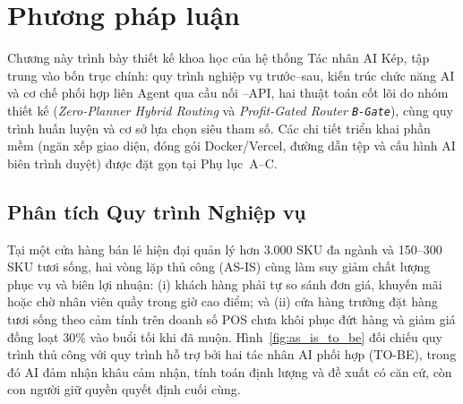 \chapter{Phương pháp luận}

Chương này trình bày thiết kế khoa học của hệ thống Tác nhân AI Kép, tập trung vào bốn trục chính: quy trình nghiệp vụ trước--sau, kiến trúc chức năng AI và cơ chế phối hợp liên Agent qua cầu nối --API, hai thuật toán cốt lõi do nhóm thiết kế (\emph{Zero-Planner Hybrid Routing} và \emph{Profit-Gated Router \texttt{B-Gate}}), cùng quy trình huấn luyện và cơ sở lựa chọn siêu tham số. Các chi tiết triển khai phần mềm (ngăn xếp giao diện, đóng gói Docker/Vercel, đường dẫn tệp và cấu hình AI biên trình duyệt) được đặt gọn tại Phụ lục~A--C.

\section{Phân tích Quy trình Nghiệp vụ}

Tại một cửa hàng bán lẻ hiện đại quản lý hơn 3.000 SKU đa ngành và 150--300 SKU tươi sống, hai vòng lặp thủ công (AS-IS) cùng làm suy giảm chất lượng phục vụ và biên lợi nhuận: (i) khách hàng phải tự so sánh đơn giá, khuyến mãi hoặc chờ nhân viên quầy trong giờ cao điểm; và (ii) cửa hàng trưởng đặt hàng tươi sống theo cảm tính trên doanh số POS chưa khôi phục đứt hàng và giảm giá đồng loạt 30\% vào buổi tối khi đã muộn. Hình~\ref{fig:as_is_to_be} đối chiếu quy trình thủ công với quy trình hỗ trợ bởi hai tác nhân AI phối hợp (TO-BE), trong đó AI đảm nhận khâu cảm nhận, tính toán định lượng và đề xuất có căn cứ, còn con người giữ quyền quyết định cuối cùng.

